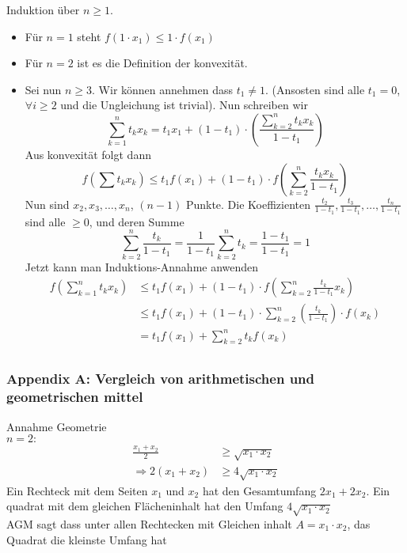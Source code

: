 \begin{beweis}{5.44}
Induktion über $n\geq 1$.\\
\begin{itemize}
\item Für $n=1$ steht $f(1\cdot x_1)\leq 1\cdot f(x_1)$ \checkmark
\item Für $n=2$ ist es die Definition der konvexität.
\item Sei nun $n\geq 3$. Wir können annehmen dass $t_1\not=1$. (Ansosten sind alle $t_1=0$, $\forall i\geq 2$ und die Ungleichung ist trivial). Nun schreiben wir
\[\sum\limits_{k = 1}^n {{t_k}{x_k}}  = {t_1}{x_1} + \left( {1 - {t_1}} \right) \cdot \left( {\frac{{\sum\limits_{k = 2}^n {{t_k}{x_k}} }}{{1 - {t_1}}}} \right)\]
Aus konvexität folgt dann
\[f\left( \sum t_kx_k \right)\leq t_1f(x_1)+\left( 1-t_1\right)\cdot f\left( \sum\limits_{k=2}^n \frac{t_k x_k}{1-t_1}\right)\]
Nun sind $x_2,x_3,\dots, x_n$, $(n-1)$ Punkte. Die Koeffizienten $\frac{t_2}{1-t_1},\frac{t_3}{1-t_1},\dots,\frac{t_n}{1-t_1}$ sind alle $\geq 0$, und deren Summe 
\[\sum\limits_{k = 2}^n {\frac{{{t_k}}}{{1 - {t_1}}}}  = \frac{1}{{1 - {t_1}}}\sum\limits_{k = 2}^n {{t_k}}  = \frac{{1 - {t_1}}}{{1 - {t_1}}} = 1\]
Jetzt kann man Induktions-Annahme anwenden 
\begin{align*}
f\left( \sum\limits_{k = 1}^n {{t_k}{x_k}} \right)&\leq t_1f(x_1)+\left( 1-t_1\right)\cdot f\left( \sum\limits_{k = 2}^n \frac{t_k}{1-t_1}x_k\right)\\
&\leq t_1f(x_1)+\left( 1-t_1\right)\cdot\sum\limits_{k = 2}^n \left(\frac{t_k}{1-t_1}\right)\cdot f(x_k)\\
&= t_1f(x_1)+\sum\limits_{k = 2}^n t_k f(x_k)\\
\end{align*}
\end{itemize}
\end{beweis}

\newpage
\subsubsection*{Appendix A: Vergleich von arithmetischen und geometrischen mittel}
Annahme Geometrie \\
$n=2:$
\begin{align*}
\frac{x_1+x_2}{2}&\geq\sqrt{x_1\cdot x_2}\\
\Rightarrow 2(x_1+x_2)&\geq 4\sqrt{x_1\cdot x_2}
\end{align*}
Ein Rechteck mit dem Seiten $x_1$ und $x_2$ hat den Gesamtumfang $2x_1+2x_2$. Ein quadrat mit dem gleichen Flächeninhalt hat den Umfang $4\sqrt{x_1\cdot x_2}$\\

AGM sagt dass unter allen Rechtecken mit Gleichen inhalt $A=x_1\cdot x_2$, das Quadrat die kleinste Umfang hat




